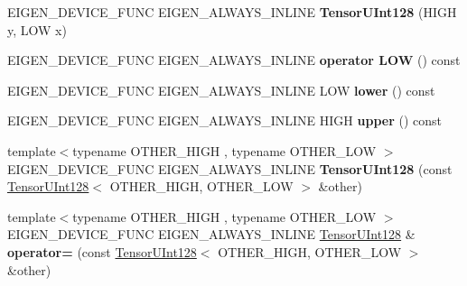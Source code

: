 \begin{DoxyCompactItemize}
\item 
\mbox{\label{struct_eigen_1_1internal_1_1_tensor_u_int128_a64b4bf45c13394b02472dcf691022ad0}} 
E\+I\+G\+E\+N\+\_\+\+D\+E\+V\+I\+C\+E\+\_\+\+F\+U\+NC E\+I\+G\+E\+N\+\_\+\+A\+L\+W\+A\+Y\+S\+\_\+\+I\+N\+L\+I\+NE {\bfseries Tensor\+U\+Int128} (H\+I\+GH y, L\+OW x)
\item 
\mbox{\label{struct_eigen_1_1internal_1_1_tensor_u_int128_ad36791afbbba3b99f9802a32f1599503}} 
E\+I\+G\+E\+N\+\_\+\+D\+E\+V\+I\+C\+E\+\_\+\+F\+U\+NC E\+I\+G\+E\+N\+\_\+\+A\+L\+W\+A\+Y\+S\+\_\+\+I\+N\+L\+I\+NE {\bfseries operator L\+OW} () const
\item 
\mbox{\label{struct_eigen_1_1internal_1_1_tensor_u_int128_a9799bd1ec39bca197d7a2011ec8f9bf5}} 
E\+I\+G\+E\+N\+\_\+\+D\+E\+V\+I\+C\+E\+\_\+\+F\+U\+NC E\+I\+G\+E\+N\+\_\+\+A\+L\+W\+A\+Y\+S\+\_\+\+I\+N\+L\+I\+NE L\+OW {\bfseries lower} () const
\item 
\mbox{\label{struct_eigen_1_1internal_1_1_tensor_u_int128_a1b1564dc24f048e95461d983359921a3}} 
E\+I\+G\+E\+N\+\_\+\+D\+E\+V\+I\+C\+E\+\_\+\+F\+U\+NC E\+I\+G\+E\+N\+\_\+\+A\+L\+W\+A\+Y\+S\+\_\+\+I\+N\+L\+I\+NE H\+I\+GH {\bfseries upper} () const
\item 
\mbox{\label{struct_eigen_1_1internal_1_1_tensor_u_int128_a1ec6a97f0a303ad5aec0b10f46b3d6b7}} 
{\footnotesize template$<$typename O\+T\+H\+E\+R\+\_\+\+H\+I\+GH , typename O\+T\+H\+E\+R\+\_\+\+L\+OW $>$ }\\E\+I\+G\+E\+N\+\_\+\+D\+E\+V\+I\+C\+E\+\_\+\+F\+U\+NC E\+I\+G\+E\+N\+\_\+\+A\+L\+W\+A\+Y\+S\+\_\+\+I\+N\+L\+I\+NE {\bfseries Tensor\+U\+Int128} (const \hyperlink{struct_eigen_1_1internal_1_1_tensor_u_int128}{Tensor\+U\+Int128}$<$ O\+T\+H\+E\+R\+\_\+\+H\+I\+GH, O\+T\+H\+E\+R\+\_\+\+L\+OW $>$ \&other)
\item 
\mbox{\label{struct_eigen_1_1internal_1_1_tensor_u_int128_a5799c262aa82de0aac673e3ffec1519f}} 
{\footnotesize template$<$typename O\+T\+H\+E\+R\+\_\+\+H\+I\+GH , typename O\+T\+H\+E\+R\+\_\+\+L\+OW $>$ }\\E\+I\+G\+E\+N\+\_\+\+D\+E\+V\+I\+C\+E\+\_\+\+F\+U\+NC E\+I\+G\+E\+N\+\_\+\+A\+L\+W\+A\+Y\+S\+\_\+\+I\+N\+L\+I\+NE \hyperlink{struct_eigen_1_1internal_1_1_tensor_u_int128}{Tensor\+U\+Int128} \& {\bfseries operator=} (const \hyperlink{struct_eigen_1_1internal_1_1_tensor_u_int128}{Tensor\+U\+Int128}$<$ O\+T\+H\+E\+R\+\_\+\+H\+I\+GH, O\+T\+H\+E\+R\+\_\+\+L\+OW $>$ \&other)

\end{DoxyCompactItemize}
